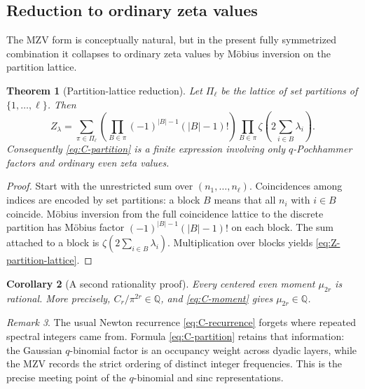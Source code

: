 \documentclass[11pt,oneside]{article}
\newtheorem{theorem}{Theorem}[section]
\newtheorem{corollary}[theorem]{Corollary}
\theoremstyle{definition}
\theoremstyle{remark}
\newtheorem{remark}[theorem]{Remark}
\newcommand{\Q}{\mathbb Q}
\begin{document}
\subsection{Reduction to ordinary zeta values}

The MZV form is conceptually natural, but in the present fully symmetrized
combination it collapses to ordinary zeta values by M\"obius inversion on the
partition lattice.

\begin{theorem}[Partition-lattice reduction]\label{thm:partition-lattice}
Let $\Pi_\ell$ be the lattice of set partitions of $\{1,\dots,\ell\}$.  Then
\begin{equation}\label{eq:Z-partition-lattice}
 \boxed{
 Z_\lambda=
 \sum_{\pi\in\Pi_\ell}
 \left(\prod_{B\in\pi}(-1)^{|B|-1}(|B|-1)!\right)
 \prod_{B\in\pi}
 \zeta\!\left(2\sum_{i\in B}\lambda_i\right).}
\end{equation}
Consequently \cref{eq:C-partition} is a finite expression involving only
$q$-Pochhammer factors and ordinary even zeta values.
\end{theorem}

\begin{proof}
Start with the unrestricted sum over $(n_1,\dots,n_\ell)$.  Coincidences among
indices are encoded by set partitions: a block $B$ means that all $n_i$ with
$i\in B$ coincide.  M\"obius inversion from the full coincidence lattice to
the discrete partition has M\"obius factor
$(-1)^{|B|-1}(|B|-1)!$ on each block.  The sum attached to a block is
$\zeta(2\sum_{i\in B}\lambda_i)$.  Multiplication over blocks yields
\cref{eq:Z-partition-lattice}.
\end{proof}

\begin{corollary}[A second rationality proof]\label{cor:q-mzv-rational}
Every centered even moment $\mu_{2r}$ is rational.  More precisely,
$C_r/\pi^{2r}\in\Q$, and \cref{eq:C-moment} gives $\mu_{2r}\in\Q$.
\end{corollary}

\begin{remark}
The usual Newton recurrence \cref{eq:C-recurrence} forgets where repeated
spectral integers came from.  Formula \cref{eq:C-partition} retains that
information: the Gaussian $q$-binomial factor is an occupancy weight across
dyadic layers, while the MZV records the strict ordering of distinct integer
frequencies.  This is the precise meeting point of the $q$-binomial and sinc
representations.
\end{remark}
\end{document}
